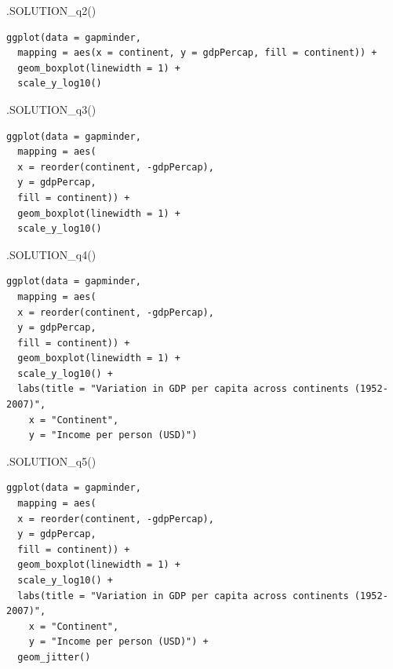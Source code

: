 \documentclass[
  letterpaper,
  DIV=11,
  numbers=noendperiod]{scrreprt}
\newenvironment{Shaded}{\begin{snugshade}}{\end{snugshade}}
\newcommand{\FunctionTok}[1]{\textcolor[rgb]{0.28,0.35,0.67}{#1}}
\newcommand{\NormalTok}[1]{\textcolor[rgb]{0.00,0.23,0.31}{#1}}
\begin{document}
\begin{Shaded}
\begin{Highlighting}[]
\FunctionTok{.SOLUTION\_q2}\NormalTok{()}
\end{Highlighting}
\end{Shaded}

\begin{verbatim}
ggplot(data = gapminder,
  mapping = aes(x = continent, y = gdpPercap, fill = continent)) +
  geom_boxplot(linewidth = 1) +
  scale_y_log10()
\end{verbatim}

\begin{Shaded}
\begin{Highlighting}[]
\FunctionTok{.SOLUTION\_q3}\NormalTok{() }
\end{Highlighting}
\end{Shaded}

\begin{verbatim}
ggplot(data = gapminder,
  mapping = aes(
  x = reorder(continent, -gdpPercap), 
  y = gdpPercap, 
  fill = continent)) +
  geom_boxplot(linewidth = 1) +
  scale_y_log10()
\end{verbatim}

\begin{Shaded}
\begin{Highlighting}[]
\FunctionTok{.SOLUTION\_q4}\NormalTok{()}
\end{Highlighting}
\end{Shaded}

\begin{verbatim}
ggplot(data = gapminder,
  mapping = aes(
  x = reorder(continent, -gdpPercap), 
  y = gdpPercap, 
  fill = continent)) +
  geom_boxplot(linewidth = 1) +
  scale_y_log10() +
  labs(title = "Variation in GDP per capita across continents (1952-2007)",
    x = "Continent",
    y = "Income per person (USD)")
\end{verbatim}

\begin{Shaded}
\begin{Highlighting}[]
\FunctionTok{.SOLUTION\_q5}\NormalTok{()}
\end{Highlighting}
\end{Shaded}

\begin{verbatim}
ggplot(data = gapminder,
  mapping = aes(
  x = reorder(continent, -gdpPercap), 
  y = gdpPercap, 
  fill = continent)) +
  geom_boxplot(linewidth = 1) +
  scale_y_log10() +
  labs(title = "Variation in GDP per capita across continents (1952-2007)",
    x = "Continent",
    y = "Income per person (USD)") + 
  geom_jitter()
\end{verbatim}
\end{document}
